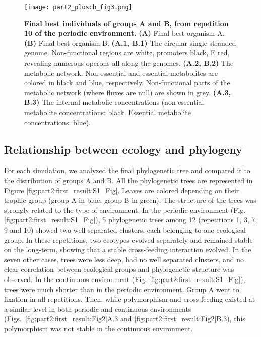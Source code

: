 \begin{figure}[!h]
\centering
\texttt{[image: part2\_ploscb\_fig3.png]}
\caption[Final best individuals of groups A and B, from repetition 10 of the periodic environment.]{{\bf Final best individuals of groups A and B, from repetition 10 of the periodic environment.} {\bf (A)} Final best organism A. {\bf (B)} Final best organism B. {\bf (A.1, B.1)} The circular single-stranded genome. Non-functional regions are white, promoters black, E red, revealing numerous operons all along the genomes. {\bf (A.2, B.2)} The metabolic network. Non essential and essential metabolites are colored in black and blue, respectively. Non-functional parts of the metabolic network (where fluxes are null) are shown in grey. {\bf (A.3, B.3)} The internal metabolic concentrations (non essential metabolite concentrations: black. Essential metabolite concentrations: blue).}
\label{fig:part2:first_result:Fig3}
\end{figure}


\subsection*{Relationship between ecology and phylogeny}

For each simulation, we analyzed the final phylogenetic tree and compared it to the distribution of groups A and B. All the phylogenetic trees are represented in Figure \ref{fig:part2:first_result:S1_Fig}. Leaves are colored depending on their trophic group (group A in blue, group B in green). The structure of the trees was strongly related to the type of environment. In the periodic environment (Fig. \ref{fig:part2:first_result:S1_Fig}), 5 phylogenetic trees among 12 (repetitions 1, 3, 7, 9 and 10) showed two well-separated clusters, each belonging to one ecological group. In these repetitions, two ecotypes evolved separately and remained stable on the long-term, showing that a stable cross-feeding interaction evolved. In the seven other cases, trees were less deep, had no well separated clusters, and no clear correlation between ecological groups and phylogenetic structure was observed. In the continuous environment (Fig. \ref{fig:part2:first_result:S1_Fig}), trees were much shorter than in the periodic environment. Group A went to fixation in all repetitions. Then, while polymorphism and cross-feeding existed at a similar level in both periodic and continuous environments (Figs.~\ref{fig:part2:first_result:Fig2}A.3 and \ref{fig:part2:first_result:Fig2}B.3), this polymorphism was not stable in the continuous environment.

